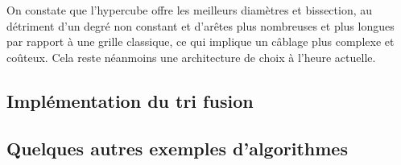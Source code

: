 On constate que l'hypercube offre les meilleurs diamètres et bissection, au détriment d'un degré non constant et d'arêtes plus nombreuses et plus longues par rapport à une grille classique, ce qui implique un câblage plus complexe et coûteux. Cela reste néanmoins une architecture de choix à l'heure actuelle.

\subsection{Implémentation du tri fusion}

\subsection{Quelques autres exemples d'algorithmes}
